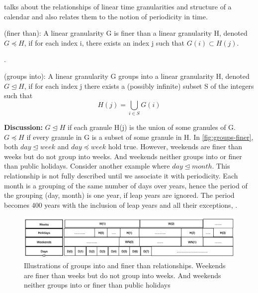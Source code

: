 \documentclass[12pt]{article}
\begin{document}
\citep{Bettini1998-ed} talks about the relationships of linear time granularities and structure of a calendar and also relates them to the notion of periodicity in time.

\begin{definition}\label{def:finerthan}
(finer than): A linear granularity G is finer than a  linear granularity H, denoted $G \preceq H$, if
for each index i, there exists an index j such that $G(i) \subset H(j)$.
\end{definition}

.

\begin{definition}\label{def:groupsinto}
(groups into): A linear granularity G groups into a linear granularity H, denoted
$G \trianglelefteq H$,
if for each index j there exists a (possibly infinite) subset S of the integers such
that
\begin{equation}
H(j) = \bigcup_{i \in S}G(i)
\end{equation}
\end{definition}

\textbf{Discussion:} \(G \trianglelefteq H\) if each granule H(j) is the union of some granules of G. \(G \preceq H\) if every granule in G is a subset of some granule in H. In \autoref{fig:groups-finer}, both \(day \trianglelefteq week\) and \(day \preceq week\) hold true. However, weekends are finer than weeks but do not group into weeks. And weekends neither groups into or finer than public holidays. Consider another example where \(day \trianglelefteq month\). This relationship is not fully described until we associate it with periodicity. Each month is a grouping of the same number of days over years, hence the period of the grouping (day, month) is one year, if leap years are ignored. The period becomes 400 years with the inclusion of leap years and all their exceptions, .

\begin{figure}

{\centering \includegraphics[width=1\linewidth]{Figs/groupsandfiner} 

}

\caption{Illustrations of groups into and finer than relationships. Weekends are finer than weeks but do not group into weeks. And weekends neither groups into or finer than public holidays}\label{fig:groups-finer}
\end{figure}
\end{document}
